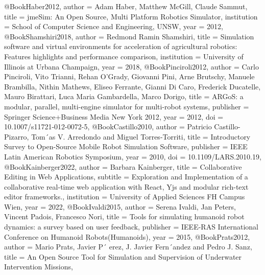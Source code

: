 \documentclass[german,version-2020-11]{uzl-thesis}
\begin{document}
%

\begin{bibtex-entries}
@Book{Haber2012,
  author =       {Adam Haber, Matthew McGill, Claude Sammut},
  title =        {jmeSim: An Open Source, Multi Platform Robotics Simulator},
  institution =    {School of Computer Science and Engineering, UNSW},
  year =         {2012},
}
@Book{Shamshiri2018,
  author =       {Redmond Ramin Shamshiri},
  title =        {Simulation software and virtual environments for acceleration of 
                  agricultural robotics: Features highlights and performance comparison},
  institution =    {University of Illinois at Urbana Champaign},
  year =         {2018},
}
@Book{Pinciroli2012,
  author =       {Carlo Pinciroli, Vito Trianni, Rehan O’Grady, Giovanni Pini, Arne Brutschy,
                  Manuele Brambilla, Nithin Mathews, Eliseo Ferrante, Gianni Di Caro,
                  Frederick Ducatelle, Mauro Birattari, Luca Maria Gambardella, Marco Dorigo},
  title =        {ARGoS: a modular, parallel, multi-engine simulator for multi-robot systems},
  publisher =    {Springer Science+Business Media New York 2012},
  year =         {2012},
  doi =          {10.1007/s11721-012-0072-5},
}
@Book{Castillo2010,
  author =       {Patricio Castillo-Pizarro, Tom´as V. Arredondo and Miguel Torres-Torriti},
  title =        {Introductory Survey to Open-Source Mobile Robot Simulation Software},
  publisher =    {IEEE Latin American Robotics Symposium},
  year =         {2010},
  doi =          {10.1109/LARS.2010.19},
}
@Book{Kainberger2022,
  author =       {Barbara Kainberger},
  title =        {Collaborative Editing in Web Applications},
  subtitle =     {Exploration and Implementation of a collaborative real-time web application
                  with React, Yjs and modular rich-text editor frameworks.},
  institution =    {University of Applied Sciences FH Campus Wien},
  year =         {2022},
}
@Book{Ivaldi2015,
  author =       {Serena Ivaldi, Jan Peters, Vincent Padois, Francesco Nori},
  title =        {Tools for simulating humanoid robot dynamics: a survey
                  based on user feedback},
  publisher =    {IEEE-RAS International Conference on Humanoid Robots(Humanoids)},
  year =         {2015},
}
@Book{Prats2012,
  author =       {Mario Prats, Javier P´ erez, J. Javier Fern´andez and Pedro J. Sanz},
  title =        {An Open Source Tool for Simulation and Supervision of Underwater Intervention Missions},
}
\end{bibtex-entries}
\end{document}
